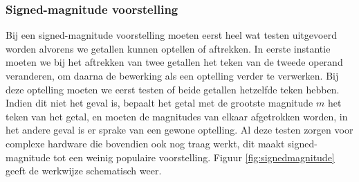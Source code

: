 \subsubsection{Signed-magnitude voorstelling}
Bij een signed-magnitude voorstelling moeten eerst heel wat testen uitgevoerd worden alvorens we getallen kunnen optellen of aftrekken. In eerste instantie moeten we bij het aftrekken van twee getallen het teken van de tweede operand veranderen, om daarna de bewerking als een optelling verder te verwerken. Bij deze optelling moeten we eerst testen of beide getallen hetzelfde teken hebben. Indien dit niet het geval is, bepaalt het getal met de grootste magnitude $m$ het teken van het getal, en moeten de magnitudes van elkaar afgetrokken worden, in het andere geval is er sprake van een gewone optelling. Al deze testen zorgen voor complexe hardware die bovendien ook nog traag werkt, dit maakt signed-magnitude tot een weinig populaire voorstelling. Figuur \ref{fig:signedmagnitude} geeft de werkwijze schematisch weer.
